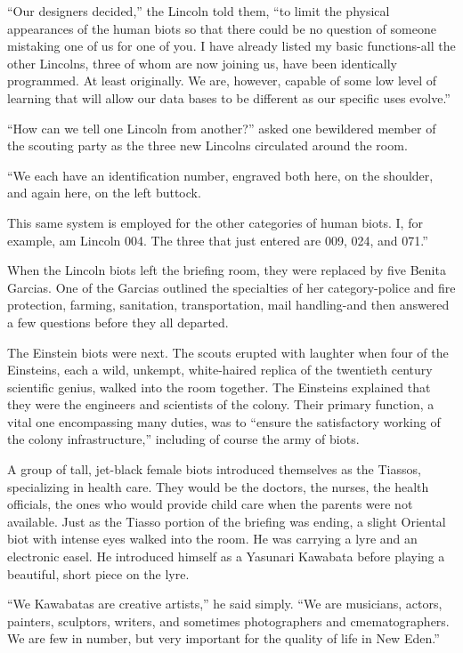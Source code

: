 \documentclass[]{article}
\begin{document}
{“Our designers decided,” the Lincoln told them, “to limit the physical appearances of the human biots so that there could be no question of someone mistaking one of us for one of you. I have already listed my basic functions-all the other Lincolns, three of whom are now joining us, have been identically programmed. At least originally. We are, however, capable of some low level of learning that will allow our data bases to be different as our specific uses evolve.”

“How can we tell one Lincoln from another?” asked one bewildered member of the scouting party as the three new Lincolns circulated around the room.

“We each have an identification number, engraved both here, on the shoulder, and again here, on the left buttock.

This same system is employed for the other categories of human biots. I, for example, am Lincoln 004. The three that just entered are 009, 024, and 071.”

When the Lincoln biots left the briefing room, they were replaced by five Benita Garcias. One of the Garcias outlined the specialties of her category-police and fire protection, farming, sanitation, transportation, mail handling-and then answered a few questions before they all departed.

The Einstein biots were next. The scouts erupted with laughter when four of the Einsteins, each a wild, unkempt, white-haired replica of the twentieth century scientific genius, walked into the room together. The Einsteins explained that they were the engineers and scientists of the colony. Their primary function, a vital one encompassing many duties, was to “ensure the satisfactory working of the colony infrastructure,” including of course the army of biots.

A group of tall, jet-black female biots introduced themselves as the Tiassos, specializing in health care. They would be the doctors, the nurses, the health officials, the ones who would provide child care when the parents were not available. Just as the Tiasso portion of the briefing was ending, a slight Oriental biot with intense eyes walked into the room. He was carrying a lyre and an electronic easel. He introduced himself as a Yasunari Kawabata before playing a beautiful, short piece on the lyre.

“We Kawabatas are creative artists,” he said simply. “We are musicians, actors, painters, sculptors, writers, and sometimes photographers and cmematographers. We are few in number, but very important for the quality of life in New Eden.”

}
\end{document}
